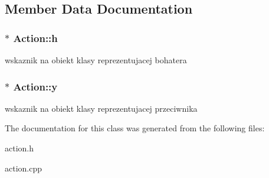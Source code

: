 \subsection{Member Data Documentation}
\hypertarget{class_action_aacf06ac0b16e0029a5cf496a49f6824b}{
\subsubsection[{h}]{$\ast$ {\bf Action::h}}}
\label{class_action_aacf06ac0b16e0029a5cf496a49f6824b}
wskaznik na obiekt klasy reprezentujacej bohatera \hypertarget{class_action_a82c9b5b9178f7f2aa3ff8113143f8d6a}{
\subsubsection[{y}]{$\ast$ {\bf Action::y}}}
\label{class_action_a82c9b5b9178f7f2aa3ff8113143f8d6a}
wskaznik na obiekt klasy reprezentujacej przeciwnika 

The documentation for this class was generated from the following files:\begin{DoxyCompactItemize}
\item 
action.h\item 
action.cpp\end{DoxyCompactItemize}
